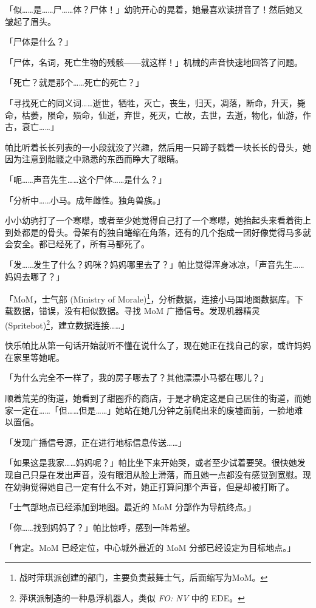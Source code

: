 「似……是……尸……体？尸体！」幼驹开心的晃着，她最喜欢读拼音了！然后她又皱起了眉头。

「尸体是什么？」

「{\mt 尸体，名词，死亡生物的残骸——就这样！}」机械的声音快速地回答了问题。

「死亡？就是那个……死亡的死亡？」

「{\mt 寻找死亡的同义词……逝世，牺牲，灭亡，丧生，归天，凋落，断命，升天，毙命，枯萎，陨命，殒命，仙逝，弃世，死灭，亡故，去世，去逝，物化，仙游，作古，衰亡……}」

帕比听着长长列表的一小段就没了兴趣，然后用一只蹄子戳着一块长长的骨头，她因为注意到骷髅之中熟悉的东西而睁大了眼睛。

「呃……声音先生……这个尸体……是什么？」

「{\mt 分析中……小马。成年雌性。独角兽族。}」

小小幼驹打了一个寒噤，或者至少她觉得自己打了一个寒噤，她抬起头来看着街上到处都是的骨头。骨架有的独自蜷缩在角落，还有的几个抱成一团好像觉得马多就会安全。都已经死了，所有马都死了。

「发……发生了什么？妈咪？妈妈哪里去了？」帕比觉得浑身冰凉，「声音先生……妈妈去哪了？」

「{\mt MoM，士气部 (Ministry of Morale)\footnote{战时萍琪派创建的部门，主要负责鼓舞士气，后面缩写为MoM。}，分析数据，连接小马国地图数据库。下载数据，错误，没有相似数据。寻找 MoM 广播信号。发现机器精灵 (Spritebot)\footnote{萍琪派制造的一种悬浮机器人，类似 \emph{FO: NV} 中的 EDE。}，建立数据连接……}」

快乐帕比从第一句话开始就听不懂在说什么了，现在她正在找自己的家，或许妈妈在家里等她呢。

「为什么完全不一样了，我的房子哪去了？其他漂漂小马都在哪儿？」

顺着荒芜的街道，她看到了甜圈乔的商店，于是才确定这是自己居住的街道，而她家一定在……「但……但是……」她站在她几分钟之前爬出来的废墟面前，一脸地难以置信。

「{\mt 发现广播信号源，正在进行地标信息传送……}」

「如果这是我家……妈妈呢？」帕比坐下来开始哭，或者至少试着要哭。很快她发现自己只是在发出声音，没有眼泪从脸上滑落，而且她一点都没有感觉到宽慰。现在幼驹觉得她自己一定有什么不对，她正打算问那个声音，但是却被打断了。

「{\mt 士气部地点已经添加到地图。最近的 MoM 分部作为导航终点。}」

「你……找到妈妈了？」帕比惊呼，感到一阵希望。

「{\mt 肯定。MoM 已经定位，中心城外最近的 MoM 分部已经设定为目标地点。}」

